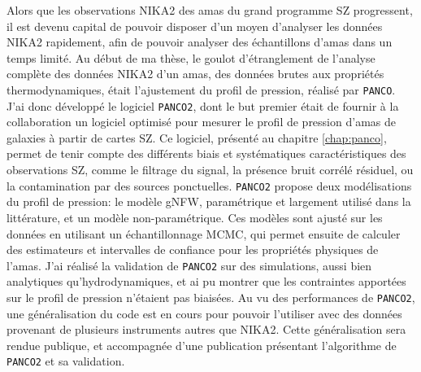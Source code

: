 Alors que les observations NIKA2 des amas du grand programme SZ progressent, il est devenu capital de pouvoir disposer d'un moyen d'analyser les données NIKA2 rapidement, afin de pouvoir analyser des échantillons d'amas dans un temps limité.
Au début de ma thèse, le goulot d'étranglement de l'analyse complète des données NIKA2 d'un amas, des données brutes aux propriétés thermodynamiques, était l'ajustement du profil de pression, réalisé par \texttt{PANCO}.
J'ai donc développé le logiciel \texttt{\texttt{PANCO}2}, dont le but premier était de fournir à la collaboration un logiciel optimisé pour mesurer le profil de pression d'amas de galaxies à partir de cartes SZ.
Ce logiciel, présenté au chapitre \ref{chap:panco}, permet de tenir compte des différents biais et systématiques caractéristiques des observations SZ, comme le filtrage du signal, la présence bruit corrélé résiduel, ou la contamination par des sources ponctuelles.
\texttt{PANCO2} propose deux modélisations du profil de pression: le modèle gNFW, paramétrique et largement utilisé dans la littérature, et un modèle non-paramétrique.
Ces modèles sont ajusté sur les données en utilisant un échantillonnage MCMC, qui permet ensuite de calculer des estimateurs et intervalles de confiance pour les propriétés physiques de l'amas.
J'ai réalisé la validation de \texttt{PANCO2} sur des simulations, aussi bien analytiques qu'hydrodynamiques, et ai pu montrer que les contraintes apportées sur le profil de pression n'étaient pas biaisées.
Au vu des performances de \texttt{PANCO2}, une généralisation du code est en cours pour pouvoir l'utiliser avec des données provenant de plusieurs instruments autres que NIKA2.
Cette généralisation sera rendue publique, et accompagnée d'une publication présentant l'algorithme de \texttt{PANCO2} et sa validation.

